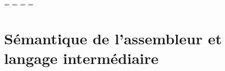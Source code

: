 
\usepackage[disable]{todonotes}


\OddHead={{\leftmark\rightmark}{\hfil\slshape\rightmark}}
\EvenHead={{\leftmark}{{\slshape\leftmark}\hfil}}
\OddFoot={\hfil\thepage}
\EvenFoot={\thepage\hfil}
\pagestyle{ThesisHeadingsII}

\mainmatter 

% 

\chapter{Sémantique de l'assembleur et langage intermédiaire}



% 
% 
% 
\printbibliography



